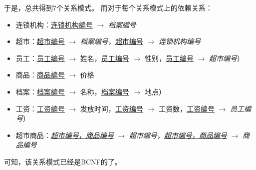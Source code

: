 于是，总共得到7个关系模式。
而对于每个关系模式上的依赖关系：
\begin{itemize}
	\item 连锁机构：\underline{连锁机构编号} $\to$ \textit{档案编号}
	\item 超市：\underline{超市编号} $\to$ \textit{档案编号}，\underline{超市编号} $\to$ \textit{连锁机构编号}
	\item 员工：\underline{员工编号} $\to$ 姓名，\underline{员工编号} $\to$ 性别，\underline{员工编号} $\to$ \textit{超市编号}）
	\item 商品：\underline{商品编号} $\to$ 价格
	\item 档案：\underline{档案编号} $\to$ 名称，\underline{档案编号} $\to$ 地点）
	\item 工资：\underline{工资编号} $\to$ 发放时间，\underline{工资编号} $\to$ 工资数，\underline{工资编号} $\to$ \textit{员工编号}）
	\item 超市商品：\underline{\textit{超市编号，商品编号}} $\to$ \textit{超市编号}，\underline{\textit{超市编号，商品编号}} $\to$ \textit{商品编号}
\end{itemize}
可知，该关系模式已经是BCNF的了。
